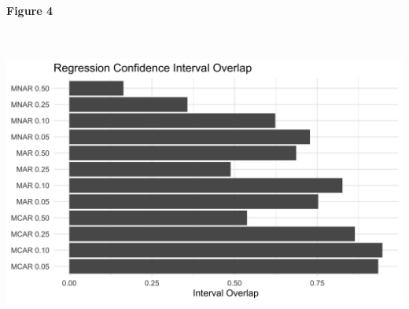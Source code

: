 \documentclass[11pt]{article}
\begin{document}
\textbf{Figure 4}

\includegraphics[width=6.5in, height=4in]{credible-interval-overlap-overall-1}
\end{document}
